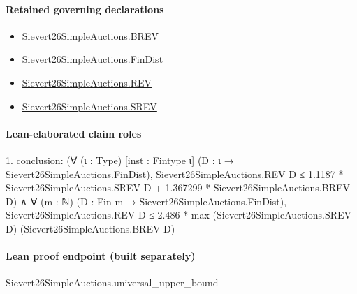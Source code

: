 \documentclass[10pt]{article}
\begin{document}
\paragraph{Retained governing declarations}
\begin{itemize}\raggedright
\item \hyperlink{paper-prerequisite-e0c4e0f254386cff}{Sievert26\allowbreak{}Simple\allowbreak{}Auctions.\allowbreak{}BREV}
\item \hyperlink{paper-prerequisite-5b39ea21863ce14e}{Sievert26\allowbreak{}Simple\allowbreak{}Auctions.\allowbreak{}Fin\allowbreak{}Dist}
\item \hyperlink{paper-prerequisite-8bbfb5082359244f}{Sievert26\allowbreak{}Simple\allowbreak{}Auctions.\allowbreak{}REV}
\item \hyperlink{paper-prerequisite-de82ecb4c67c171b}{Sievert26\allowbreak{}Simple\allowbreak{}Auctions.\allowbreak{}SREV}
\end{itemize}
\paragraph{Lean-elaborated claim roles}\begin{ReviewVerbatim}
1. conclusion: (∀ (ι : Type) [inst : Fintype ι] (D : ι → Sievert26SimpleAuctions.FinDist),
    Sievert26SimpleAuctions.REV D ≤
      1.1187 * Sievert26SimpleAuctions.SREV D + 1.367299 * Sievert26SimpleAuctions.BREV D) ∧
  ∀ (m : ℕ) (D : Fin m → Sievert26SimpleAuctions.FinDist),
    Sievert26SimpleAuctions.REV D ≤ 2.486 * max (Sievert26SimpleAuctions.SREV D) (Sievert26SimpleAuctions.BREV D)
\end{ReviewVerbatim}

\paragraph{Lean proof endpoint (built separately)}\begin{ReviewVerbatim}
Sievert26SimpleAuctions.universal_upper_bound
\end{ReviewVerbatim}
\end{document}
